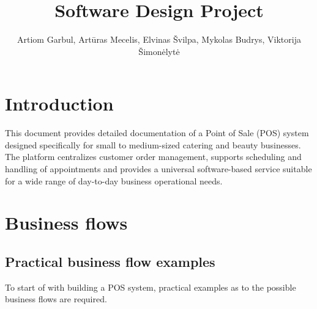 \documentclass[11pt,a4paper,pdftex]{article}
\title{Software Design Project}
\author{Artiom Garbul, Artūras Mecelis, Elvinas Švilpa, Mykolas Budrys, Viktorija Šimonėlytė}
\begin{document}
\maketitle
\clearpage

\section{Introduction}

This document provides detailed documentation of a Point of Sale (POS) system designed specifically for small to medium-sized catering and beauty businesses. The platform centralizes customer order management, supports scheduling and handling of appointments and provides a universal software-based service suitable for a wide range of day-to-day business operational needs.

\section{Business flows}
\subsection{Practical business flow examples}
To start of with building a POS system, practical examples as to the possible business flows are required.
\end{document}
